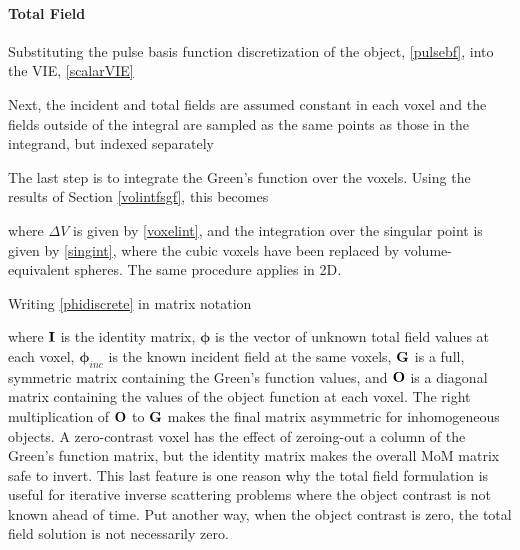 \paragraph{Total Field}

Substituting the pulse basis function discretization of the object, \eqref{pulsebf}, into the VIE, \eqref{scalarVIE}

Next, the incident and total fields are assumed constant in each voxel and the fields outside of the integral are sampled as the same points as those in the integrand, but indexed separately

The last step is to integrate the Green's function over the voxels. Using the results of Section \eqref{volintfsgf}, this becomes

\noindent where $\Delta V$ is given by \eqref{voxelint}, and the integration over the singular point is given by \eqref{singint}, where the cubic voxels have been replaced by volume-equivalent spheres. The same procedure applies in 2D.  

Writing \eqref{phidiscrete} in matrix notation 

\noindent where $\mathbf{I}$ is the identity matrix, $\boldsymbol{\phi}$ is the vector of unknown total field values at each voxel, $\boldsymbol{\phi}_{inc}$ is the known incident field at the same voxels, $\mathbf{G}$ is a full, symmetric matrix containing the Green's function values, and $\mathbf{O}$ is a diagonal matrix containing the values of the object function at each voxel. The right multiplication of $\mathbf{O}$ to $\mathbf{G}$ makes the final matrix asymmetric for inhomogeneous objects.  A zero-contrast voxel has the effect of zeroing-out a column of the Green's function matrix, but the identity matrix makes the overall MoM matrix safe to invert. This last feature is one reason why the total field formulation is useful for iterative inverse scattering problems where the object contrast is not known ahead of time.  Put another way, when the object contrast is zero, the total field solution is not necessarily zero. 

